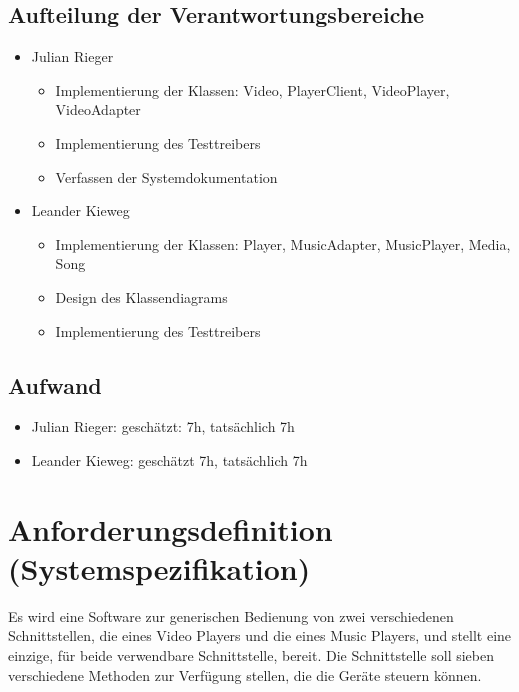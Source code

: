 \documentclass[a4paper,12pt]{article}
\begin{document}
\subsection{Aufteilung der Verantwortungsbereiche}
\begin{itemize}
\item Julian Rieger
    \begin{itemize}
        \item Implementierung der Klassen: Video, PlayerClient, VideoPlayer, VideoAdapter
        \item Implementierung des Testtreibers
        \item Verfassen der Systemdokumentation
    \end{itemize}
\item Leander Kieweg
    \begin{itemize}
        \item Implementierung der Klassen: Player, MusicAdapter, MusicPlayer, Media, Song
        \item Design des Klassendiagrams
        \item Implementierung des Testtreibers

    \end{itemize}
\end{itemize}

\subsection{Aufwand}
\begin{itemize}
\item Julian Rieger: geschätzt: 7h, tatsächlich 7h
\item Leander Kieweg: geschätzt 7h, tatsächlich 7h
\end{itemize}

\newpage
\section{Anforderungsdefinition (Systemspezifikation)}
Es wird eine Software zur generischen Bedienung von zwei verschiedenen Schnittstellen, die eines Video Players und die eines Music Players, und stellt eine einzige, für beide verwendbare Schnittstelle, bereit. Die Schnittstelle soll sieben verschiedene Methoden zur Verfügung stellen, die die Geräte steuern können.
\end{document}
